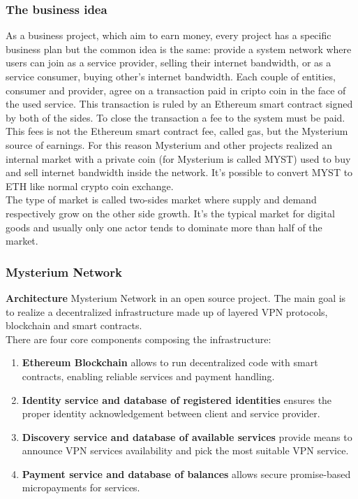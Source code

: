 \documentclass[]{article}
\begin{document}
	\subsubsection{The business idea}
	As a business project, which aim to earn money, every project has a specific business plan but the common idea is the same: provide a system network where users can join as a service provider, selling their internet bandwidth, or as a service consumer, buying other's internet bandwidth. Each couple of entities, consumer and provider, agree on a transaction paid in cripto coin in the face of the used service. This transaction is ruled by an Ethereum smart contract signed by both of the sides. To close the transaction a fee to the system must be paid. This fees is not the Ethereum smart contract fee, called gas, but the Mysterium source of earnings. For this reason Mysterium and other projects realized an internal market with a private coin (for Mysterium is called MYST) used to buy and sell internet bandwidth inside the network. It's possible to convert MYST to ETH like normal crypto coin exchange.\\
	The type of market is called two-sides market where supply and demand respectively grow on the other side growth. It's the typical market for digital goods and usually only one actor tends to dominate more than half of the market.
		
	\subsubsection{Mysterium Network}
	
	\textbf{Architecture}
	Mysterium Network in an open source project. The main goal is to realize a decentralized infrastructure made up of layered VPN protocols, blockchain and smart contracts.\\
	There are four core components composing the infrastructure:
	\begin{enumerate}
		\item \textbf{Ethereum Blockchain} allows to run decentralized code with smart contracts, enabling reliable
		services and payment handling.
		\item \textbf{Identity service and database of registered identities} ensures the proper identity
		acknowledgement between client and service provider.
		\item \textbf{Discovery service and database of available services} provide means to announce
		VPN services availability and pick the most suitable VPN service.
		\item \textbf{Payment service and database of balances} allows secure promise-based
		micropayments for services.
	\end{enumerate}
	
\end{document}
